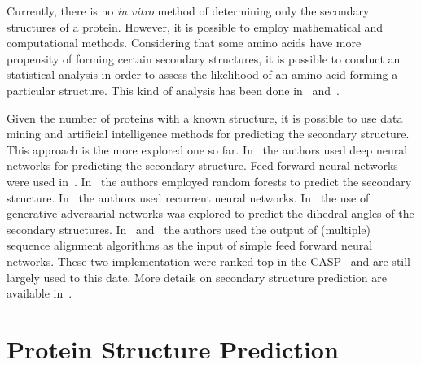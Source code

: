Currently, there is no \textit{in vitro} method of determining only the secondary structures of a protein. However, it is possible to employ mathematical and computational methods. Considering that some amino acids have more propensity of forming certain secondary structures, it is possible to conduct an statistical analysis in order to assess the likelihood of an amino acid forming a particular structure. This kind of analysis has been done
in~\cite{dunbrack1993backbone} and~\cite{borguesan2015apl}.

Given the number of proteins with a known structure, it is possible to use data mining and artificial intelligence methods for predicting the secondary structure. This approach is the more explored one so far. In~\cite{wang2016protein} the authors used deep neural networks for predicting the secondary structure. Feed forward neural networks were used in~\cite{meng2016computational}. In~\cite{kathuria2018predicting} the authors employed random forests to predict the secondary structure. In~\cite{baldi1999exploiting} the authors used recurrent neural networks. In~\cite{kim2018dihedral} the use of generative adversarial networks was explored to predict the dihedral angles of the secondary structures. In~\cite{pollastri2002improving} and~\cite{mcguffin2000psipred} the authors used the output of (multiple) sequence alignment algorithms as the input of simple feed forward neural networks. These two implementation were ranked top in the \ac{CASP}~\cite{moult1999critical} and are still largely used to this date. More details on secondary structure prediction are available in~\cite{jiang2017protein}.


\section{Protein Structure Prediction}
\label{sec:psp}
\label{sec:pspp}
\label{sec:protein-structure}




